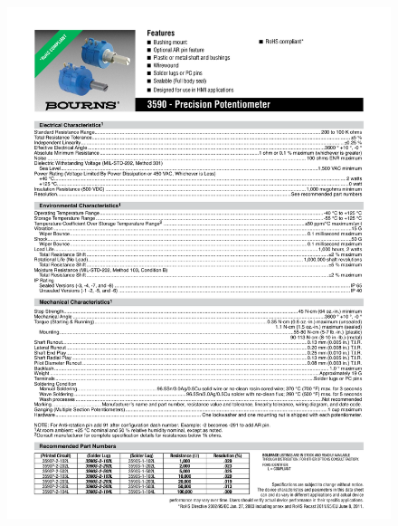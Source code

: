 \begin{figure}[h]   
\begin{centering}
\includegraphics[width=0.85\columnwidth]{datasheets/bournspot.pdf}
\par\end{centering}

\end{figure}